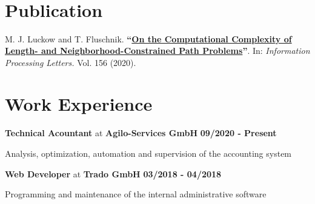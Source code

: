 \documentclass[11pt]{thyv}
\begin{document}
	\begin{mdframed}

		\begin{minipage}[t]{0.50\textwidth} %
			\vspace{-\baselineskip} %

			\\
			\\
				
		\end{minipage}
		\begin{minipage}[t]{0.50\textwidth} 
			\vspace{-\baselineskip} %
			
			\\
			\\
		\end{minipage}


		\section{Publication}
			M. J. Luckow and T. Fluschnik. \textbf{``\href{https://doi.org/10.1016/j.ipl.2019.105913}{On the Computational Complexity of Length- and Neighborhood-Constrained Path Problems}''}. In: \textit{Information Processing Letters.} Vol. 156 (2020). %

		\section{Work Experience}

			\textbf{Technical Acountant} at \textbf{Agilo-Services GmbH}				\hfill \textbf{09/2020 - Present}
				\begin{loneinnerlist}
					\item Analysis, optimization, automation and supervision of the accounting system
				\end{loneinnerlist}

			\bigskip
			\textbf{Web Developer} at \textbf{Trado GmbH}								\hfill \textbf{03/2018 - 04/2018}
				\begin{loneinnerlist}
					\item Programming and maintenance of the internal administrative software
				\end{loneinnerlist}


\end{mdframed}
\end{document}
